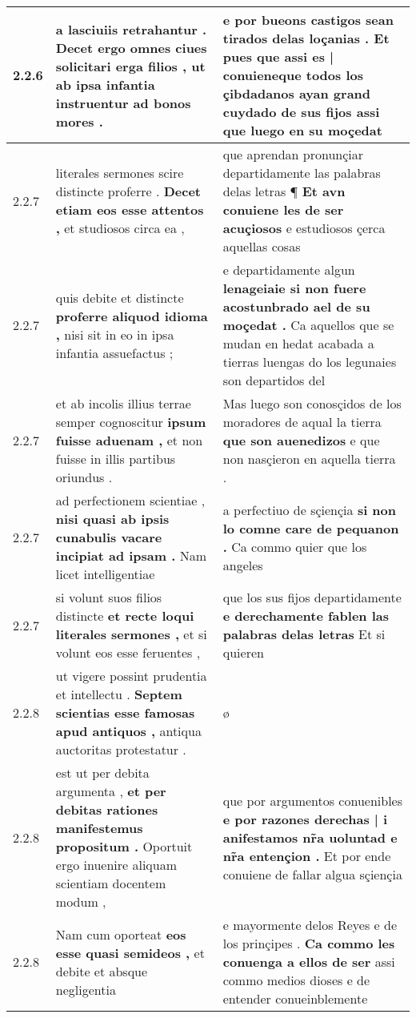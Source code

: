 \begin{tabular}{|p{1cm}|p{6.5cm}|p{6.5cm}|}
2.2.6 & a lasciuiis retrahantur . \textbf{ Decet ergo omnes ciues solicitari erga filios , } ut ab ipsa infantia instruentur ad bonos mores . & e por bueons castigos sean tirados delas loçanias . \textbf{ Et pues que assi es | conuieneque todos los çibdadanos ayan grand cuydado de sus fijos } assi que luego en su moçedat \\\hline
2.2.7 & literales sermones scire distincte proferre . \textbf{ Decet etiam eos esse attentos , } et studiosos circa ea , & que aprendan pronunçiar departidamente las palabras delas letras ¶ \textbf{ Et avn conuiene les de ser acuçiosos } e estudiosos çerca aquellas cosas \\\hline
2.2.7 & quis debite et distincte \textbf{ proferre aliquod idioma , } nisi sit in eo in ipsa infantia assuefactus ; & e departidamente algun \textbf{ lenageiaie si non fuere acostunbrado ael de su moçedat . } Ca aquellos que se mudan en hedat acabada a tierras luengas do los legunaies son departidos del \\\hline
2.2.7 & et ab incolis illius terrae semper cognoscitur \textbf{ ipsum fuisse aduenam , } et non fuisse in illis partibus oriundus . & Mas luego son conosçidos de los moradores de aqual la tierra \textbf{ que son auenedizos } e que non nasçieron en aquella tierra . \\\hline
2.2.7 & ad perfectionem scientiae , \textbf{ nisi quasi ab ipsis cunabulis vacare incipiat ad ipsam . } Nam licet intelligentiae & a perfectiuo de sçiençia \textbf{ si non lo comne care de pequanon . } Ca commo quier que los angeles \\\hline
2.2.7 & si volunt suos filios distincte \textbf{ et recte loqui literales sermones , } et si volunt eos esse feruentes , & que los sus fijos departidamente \textbf{ e derechamente fablen las palabras delas letras } Et si quieren \\\hline
2.2.8 & ut vigere possint prudentia et intellectu . \textbf{ Septem scientias esse famosas apud antiquos , } antiqua auctoritas protestatur . & ø \\\hline
2.2.8 & est ut per debita argumenta , \textbf{ et per debitas rationes manifestemus propositum . } Oportuit ergo inuenire aliquam scientiam docentem modum , & que por argumentos conuenibles \textbf{ e por razones derechas | i anifestamos nr̃a uoluntad e nr̃a entençion . } Et por ende conuiene de fallar algua sçiençia \\\hline
2.2.8 & Nam cum oporteat \textbf{ eos esse quasi semideos , } et debite et absque negligentia & e mayormente delos Reyes e de los prinçipes . \textbf{ Ca commo les conuenga a ellos de ser } assi commo medios dioses e de entender conueinblemente \\\hline

\end{tabular}
